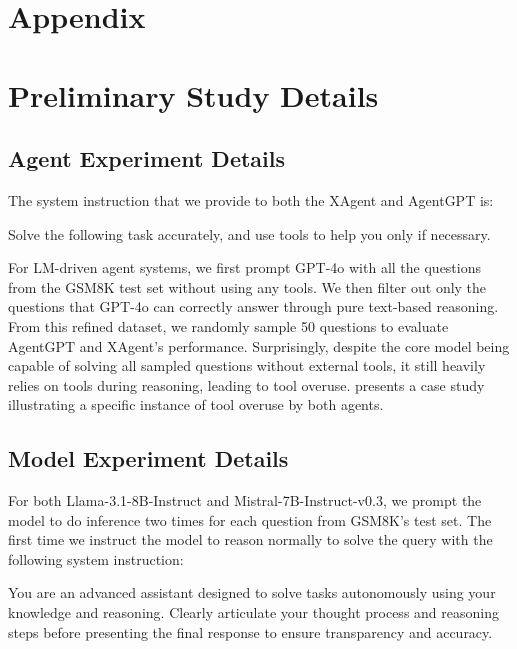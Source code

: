 \clearpage
\appendix

\section*{Appendix}
\label{sec:appendix}

\section{Preliminary Study Details}

\subsection{Agent Experiment Details}
\label{apdx:prelim_agent}
The system instruction that we provide to both the XAgent and AgentGPT is:
\begin{tcolorbox}[colback=gray!5!white, colframe=gray!75!black, 
title=Prompt for Agent Preliminary Study, boxrule=0.3mm, width=0.49\textwidth, arc=3mm, auto outer arc=true]
Solve the following task accurately, and use tools to help you only if necessary.
\end{tcolorbox}
For LM-driven agent systems, we first prompt GPT-4o with all the questions from the GSM8K test set without using any tools. We then filter out only the questions that GPT-4o can correctly answer through pure text-based reasoning. From this refined dataset, we randomly sample 50 questions to evaluate AgentGPT and XAgent’s performance. Surprisingly, despite the core model being capable of solving all sampled questions without external tools, it still heavily relies on tools during reasoning, leading to tool overuse.
 presents a case study illustrating a specific instance of tool overuse by both agents.

\subsection{Model Experiment Details}
\label{apdx:prelim_model}
For both Llama-3.1-8B-Instruct and Mistral-7B-Instruct-v0.3, we prompt the model to do inference two times for each question from GSM8K's test set. The first time we instruct the model to reason normally to solve the query with the following system instruction:
\begin{tcolorbox}[colback=gray!5!white, colframe=gray!75!black, 
title=Prompt for Model Preliminary Study (Normal), boxrule=0.3mm, width=0.49\textwidth, arc=3mm, auto outer arc=true]
You are an advanced assistant designed to solve tasks autonomously using your knowledge and reasoning. Clearly articulate your thought process and reasoning steps before presenting the final response to ensure transparency and accuracy.
\end{tcolorbox}


